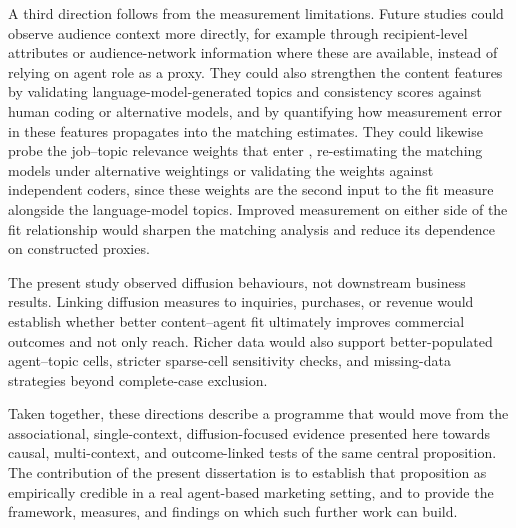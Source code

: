 A third direction follows from the measurement limitations. Future studies could observe audience context more directly, for example through recipient-level attributes or audience-network information where these are available, instead of relying on agent role as a proxy. They could also strengthen the content features by validating language-model-generated topics and consistency scores against human coding or alternative models, and by quantifying how measurement error in these features propagates into the matching estimates. They could likewise probe the job–topic relevance weights that enter , re-estimating the matching models under alternative weightings or validating the weights against independent coders, since these weights are the second input to the fit measure alongside the language-model topics. Improved measurement on either side of the fit relationship would sharpen the matching analysis and reduce its dependence on constructed proxies.

The present study observed diffusion behaviours, not downstream business results. Linking diffusion measures to inquiries, purchases, or revenue would establish whether better content–agent fit ultimately improves commercial outcomes and not only reach. Richer data would also support better-populated agent–topic cells, stricter sparse-cell sensitivity checks, and missing-data strategies beyond complete-case exclusion.

Taken together, these directions describe a programme that would move from the associational, single-context, diffusion-focused evidence presented here towards causal, multi-context, and outcome-linked tests of the same central proposition. The contribution of the present dissertation is to establish that proposition as empirically credible in a real agent-based marketing setting, and to provide the framework, measures, and findings on which such further work can build.
